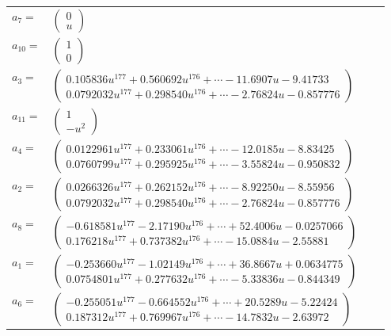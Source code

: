 \documentclass[1p]{elsarticle_modified}
\theoremstyle{definition}
\begin{document}
\begin{tabular}{m{7pt} m{180pt} m{7pt} m{180pt} }
\flushright $a_{7}=$&$\begin{pmatrix}0\\u\end{pmatrix}$ \\
\flushright $a_{10}=$&$\begin{pmatrix}1\\0\end{pmatrix}$ \\
\flushright $a_{3}=$&$\begin{pmatrix}0.105836 u^{177}+0.560692 u^{176}+\cdots-11.6907 u-9.41733\\0.0792032 u^{177}+0.298540 u^{176}+\cdots-2.76824 u-0.857776\end{pmatrix}$ \\
\flushright $a_{11}=$&$\begin{pmatrix}1\\- u^2\end{pmatrix}$ \\
\flushright $a_{4}=$&$\begin{pmatrix}0.0122961 u^{177}+0.233061 u^{176}+\cdots-12.0185 u-8.83425\\0.0760799 u^{177}+0.295925 u^{176}+\cdots-3.55824 u-0.950832\end{pmatrix}$ \\
\flushright $a_{2}=$&$\begin{pmatrix}0.0266326 u^{177}+0.262152 u^{176}+\cdots-8.92250 u-8.55956\\0.0792032 u^{177}+0.298540 u^{176}+\cdots-2.76824 u-0.857776\end{pmatrix}$ \\
\flushright $a_{8}=$&$\begin{pmatrix}-0.618581 u^{177}-2.17190 u^{176}+\cdots+52.4006 u-0.0257066\\0.176218 u^{177}+0.737382 u^{176}+\cdots-15.0884 u-2.55881\end{pmatrix}$ \\
\flushright $a_{1}=$&$\begin{pmatrix}-0.253660 u^{177}-1.02149 u^{176}+\cdots+36.8667 u+0.0634775\\0.0754801 u^{177}+0.277632 u^{176}+\cdots-5.33836 u-0.844349\end{pmatrix}$ \\
\flushright $a_{6}=$&$\begin{pmatrix}-0.255051 u^{177}-0.664552 u^{176}+\cdots+20.5289 u-5.22424\\0.187312 u^{177}+0.769967 u^{176}+\cdots-14.7832 u-2.63972\end{pmatrix}$ \\

\end{tabular}
\end{document}
